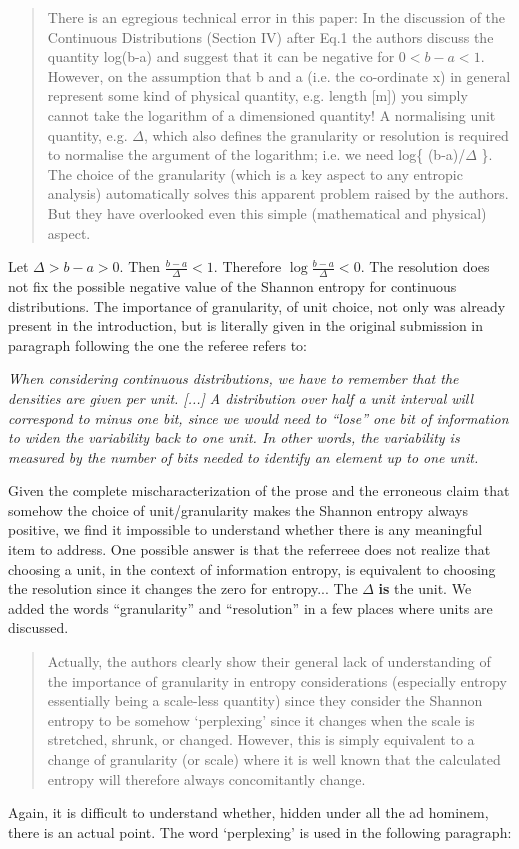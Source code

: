 \documentclass[11pt]{article}
\begin{document}
\begin{quote}
	There is an egregious technical error in this paper: In the discussion of the Continuous Distributions (Section IV) after Eq.1 the authors discuss the quantity log(b-a) and suggest that it can be negative for $0<b-a<1$. However, on the assumption that b and a (i.e. the co-ordinate x) in general represent some kind of physical quantity, e.g. length [m]) you simply cannot take the logarithm of a dimensioned quantity! A normalising unit quantity, e.g. $\Delta$, which also defines the granularity or resolution is required to normalise the argument of the logarithm; i.e. we need log\{ (b-a)/$\Delta$ \}. The choice of the granularity (which is a key aspect to any entropic analysis) automatically solves this apparent problem raised by the authors. But they have overlooked even this simple (mathematical and physical) aspect.
\end{quote}
Let $\Delta > b - a > 0$. Then $\frac{b-a}{\Delta} < 1$. Therefore $\log \frac{b-a}{\Delta} < 0$. The resolution does not fix the possible negative value of the Shannon entropy for continuous distributions. The importance of granularity, of unit choice, not only was already present in the introduction, but is literally given in the original submission in paragraph following the one the referee refers to:

\emph{	When considering continuous distributions, we have to remember that the densities are given per unit. [...] A distribution over half a unit interval will correspond to minus one bit, since we would need to ``lose'' one bit of information to widen the variability back to one unit. In other words, the variability is measured by the number of bits needed to identify an element up to one unit.}

Given the complete mischaracterization of the prose and the erroneous claim that somehow the choice of unit/granularity makes the Shannon entropy always positive, we find it impossible to understand whether there is any meaningful item to address. One possible answer is that the referreee does not realize that choosing a unit, in the context of information entropy, is equivalent to choosing the resolution since it changes the zero for entropy... The $\Delta$ \textbf{is} the unit. We added the words ``granularity'' and ``resolution'' in a few places where units are discussed. 

\begin{quote}
Actually, the authors clearly show their general lack of understanding of the importance of granularity in entropy considerations (especially entropy essentially being a scale-less quantity) since they consider the Shannon entropy to be somehow ‘perplexing’ since it changes when the scale is stretched, shrunk, or changed. However, this is simply equivalent to a change of granularity (or scale) where it is well known that the calculated entropy will therefore always concomitantly change. 
\end{quote}
Again, it is difficult to understand whether, hidden under all the ad hominem, there is an actual point. The word `perplexing' is used in the following paragraph:
\end{document}
